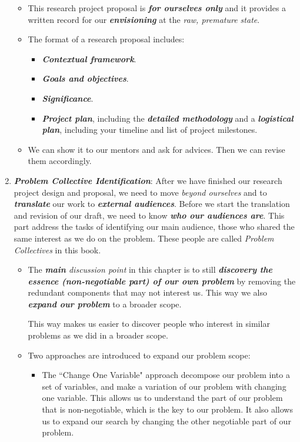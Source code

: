 \documentclass[11pt]{article}
\begin{document}
\begin{enumerate}
\begin{itemize}
\item This research project proposal is \emph{\textbf{for ourselves only}} and it provides a written record for our \emph{\textbf{envisioning}} at the \emph{raw, premature state}. 

\item The format of a research proposal includes:
\begin{itemize}
\item \textbf{\emph{Contextual framework}}. 
\item \textbf{\emph{Goals and objectives}}.
\item \textbf{\emph{Significance}}. 

\item  \textbf{\emph{Project plan}}, including the \textbf{\emph{detailed methodology}} and a \textbf{\emph{logistical plan}}, including your timeline and list of project milestones.
\end{itemize}

\item We can show it to our mentors and ask for advices. Then we can revise them accordingly. 
\end{itemize}

\item  \emph{\textbf{Problem Collective Identification}}: After we have finished our research project design and proposal, we need to move \emph{beyond ourselves} and to \emph{\textbf{translate}} our work to \emph{\textbf{external audiences}}. Before we start the translation and revision of our draft, we need to know \emph{\textbf{who our audiences are}}. This part address the tasks of identifying our main audience, those who shared the same interest as we do on the problem. These people are called \emph{Problem Collectives} in this book. 

\begin{itemize}
\item The \emph{\textbf{main} discussion point} in this chapter is to still \emph{\textbf{discovery the essence (non-negotiable part) of our own problem}} by removing the redundant components that may not interest us.  This way we also \emph{\textbf{expand our problem}} to a broader scope. 

This way makes us easier to discover people who interest in similar problems as we did in a broader scope.

\item Two approaches are introduced to expand our problem scope:
\begin{itemize}
\item The ``Change One Variable" approach decompose our problem into a set of variables, and make a variation of our problem with changing one variable. This allows us to understand the part of our problem that is non-negotiable, which is the key to our problem. It also allows us to expand our search by changing the other negotiable part of our problem. 


\end{itemize}
\end{itemize}
\end{enumerate}
\end{document}
